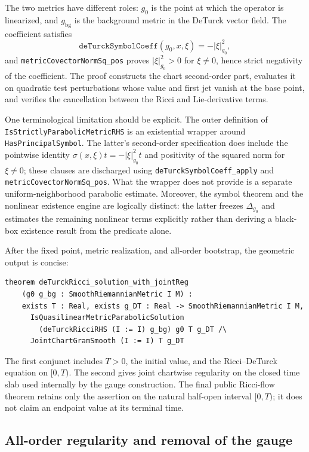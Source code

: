 \documentclass[11pt]{article}
\theoremstyle{plain}
\theoremstyle{definition}
\theoremstyle{remark}
\newcommand{\leanref}[1]{\nolinkurl{#1}}
\begin{document}
The two metrics have different roles: $g_0$ is the point at which the operator
is linearized, and $g_{\mathrm{bg}}$ is the background metric in the DeTurck
vector field.  The coefficient satisfies
\[
  \mathtt{deTurckSymbolCoeff}(g_0,x,\xi)
       =-\lvert\xi\rvert_{g_0}^{2},
\]
and \leanref{metricCovectorNormSq_pos} proves
$\lvert\xi\rvert_{g_0}^2>0$ for $\xi\ne0$, hence strict negativity of the
coefficient.  The proof constructs the chart second-order part, evaluates it on
quadratic test perturbations whose value and first jet vanish at the base
point, and verifies the cancellation between the Ricci and Lie-derivative
terms.

One terminological limitation should be explicit.  The outer definition of
\leanref{IsStrictlyParabolicMetricRHS} is an existential wrapper around
\leanref{HasPrincipalSymbol}.  The latter's second-order specification does
include the pointwise identity
$\sigma(x,\xi)t=-\lvert\xi\rvert_{g_0}^2t$ and positivity of the squared norm
for $\xi\ne0$; these clauses are discharged using
\leanref{deTurckSymbolCoeff_apply} and
\leanref{metricCovectorNormSq_pos}.  What the wrapper does not provide is a
separate uniform-neighborhood parabolic estimate.  Moreover, the symbol
theorem and the nonlinear existence engine are logically distinct:
the latter freezes $\Delta_{g_0}$ and estimates the remaining nonlinear terms
explicitly rather than deriving a black-box existence result from the
predicate alone.

After the fixed point, metric realization, and all-order bootstrap, the
geometric output is concise:

\begin{Verbatim}[breaklines=true,breakanywhere=true,fontsize=\small]
theorem deTurckRicci_solution_with_jointReg
    (g0 g_bg : SmoothRiemannianMetric I M) :
    exists T : Real, exists g_DT : Real -> SmoothRiemannianMetric I M,
      IsQuasilinearMetricParabolicSolution
        (deTurckRicciRHS (I := I) g_bg) g0 T g_DT /\
      JointChartGramSmooth (I := I) T g_DT
\end{Verbatim}

The first conjunct includes $T>0$, the initial value, and the
Ricci--DeTurck equation on $[0,T)$.  The second gives joint chartwise
regularity on the closed time slab used internally by the gauge construction.
The final public Ricci-flow theorem retains only the assertion on the natural
half-open interval $[0,T)$; it does not claim an endpoint value at its terminal
time.

\subsection{All-order regularity and removal of the gauge}
\label{subsec:short-time-gauge-removal}
\end{document}
